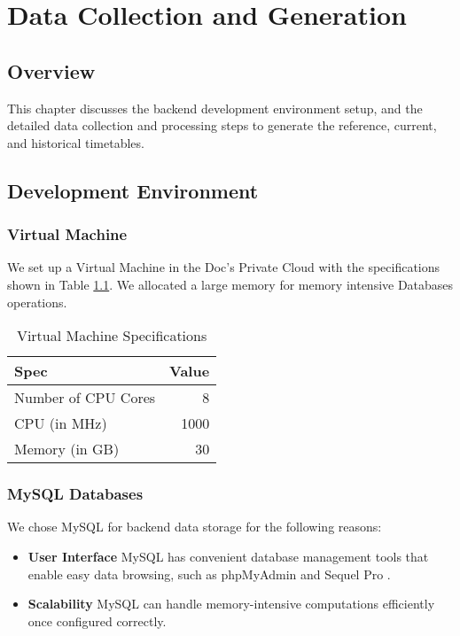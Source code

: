 \chapter{Data Collection and Generation}
\label{ch:data_generation}
\section{Overview}
\par This chapter discusses the backend development environment setup, and the detailed data collection and processing steps to generate the reference, current, and historical timetables.


\section{Development Environment}
\subsection{Virtual Machine}
\par We set up a Virtual Machine in the Doc's Private Cloud\cite{private_cloud} with the specifications shown in Table \ref{table:virtual_machine}. We allocated a large memory for memory intensive Databases operations.

\begin{table}
\centering
\begin{tabular}{@{}lr@{}} \toprule
Spec & Value \\ \midrule
Number of CPU Cores & 8 \\
CPU (in MHz) & 1000 \\
Memory (in GB) & 30 \\
 \bottomrule
\end{tabular}
\caption{Virtual Machine Specifications}
\label{table:virtual_machine}
\end{table}

\subsection{MySQL Databases}
\par We chose MySQL for backend data storage for the following reasons:

\begin{itemize}
  \item \textbf{User Interface} MySQL has convenient database management tools that enable easy data browsing, such as phpMyAdmin\cite{phpmyadmin} and Sequel Pro \cite{sequel_pro}.
  \item \textbf{Scalability} MySQL can handle memory-intensive computations efficiently once configured correctly.
\end{itemize}


